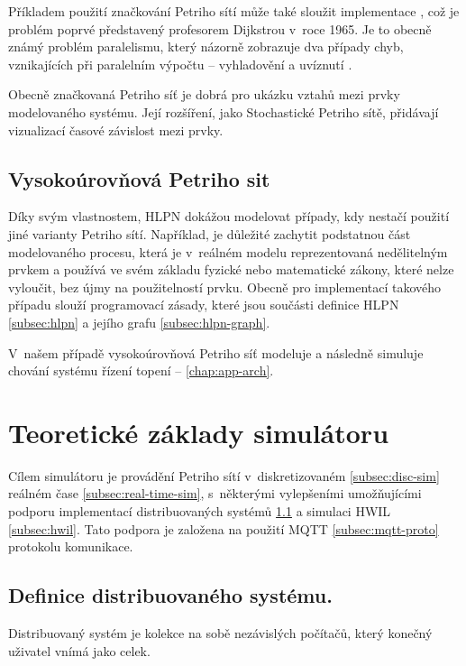 Příkladem použití značkování Petriho sítí může také sloužit implementace  \cite[p.65--67]{PNandMoS}, což je problém poprvé představený profesorem Dijkstrou v~roce 1965.
Je to obecně známý problém paralelismu, který názorně zobrazuje dva případy chyb, vznikajících při paralelním výpočtu -- vyhladovění a uvíznutí \cite{dining_philosophers}.

Obecně značkovaná Petriho síť je dobrá pro ukázku vztahů mezi prvky modelovaného systému. Její rozšíření, jako Stochastické Petriho sítě, přidávají vizualizací časové závislost mezi prvky.

\subsection{Vysokoúrovňová Petriho sit}

Díky svým vlastnostem, HLPN dokážou modelovat případy, kdy nestačí použití jiné varianty Petriho sítí. Například, je důležité zachytit podstatnou část modelovaného procesu, která je v~reálném modelu reprezentovaná nedělitelným prvkem a používá ve svém základu fyzické nebo matematické zákony, které nelze vyloučit, bez újmy na použitelností prvku. Obecně pro implementací takového případu slouží programovací zásady, které jsou součásti definice HLPN \ref{subsec:hlpn} a jejího grafu \ref{subsec:hlpn-graph}.

V~našem případě vysokoúrovňová Petriho síť modeluje a následně simuluje chování systému řízení topení -- \ref{chap:app-arch}.

\section{Teoretické základy simulátoru}
\label{sec:sim-theory}

Cílem simulátoru je provádění Petriho sítí v~diskretizovaném \ref{subsec:disc-sim} reálném čase \ref{subsec:real-time-sim}, s~některými vylepšeními umožňujícími podporu implementací distribuovaných systémů \ref{subsec:distr_system} a simulaci HWIL \ref{subsec:hwil}. Tato podpora je založena na použití MQTT \ref{subsec:mqtt-proto} protokolu komunikace.

\subsection{Definice distribuovaného systému.}
\label{subsec:distr_system}

Distribuovaný systém je kolekce na sobě nezávislých počítačů, který konečný uživatel vnímá jako celek.

